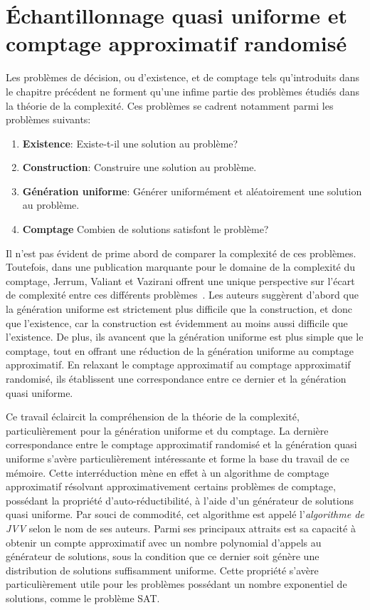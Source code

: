 \chapter{Échantillonnage quasi uniforme et comptage approximatif randomisé}
\label{cha:echantillonnage-quasi-uniforme-comptage-approximatif-randomise}

Les problèmes de décision, ou d'existence, et de comptage tels qu'introduits dans le chapitre précédent ne forment qu'une infime partie des problèmes étudiés dans la théorie de la complexité. Ces problèmes se cadrent notamment parmi les problèmes suivants:

\begin{enumerate}[(1)]
    \item \textbf{Existence}: Existe-t-il une solution au problème?
    \item \textbf{Construction}: Construire une solution au problème.
    \item \textbf{Génération uniforme}: Générer uniformément et aléatoirement une solution au problème.
    \item \textbf{Comptage} Combien de solutions satisfont le problème?
\end{enumerate}

Il n'est pas évident de prime abord de comparer la complexité de ces problèmes. Toutefois, dans une publication marquante pour le domaine de la complexité du comptage, Jerrum, Valiant et Vazirani offrent une unique perspective sur l'écart de complexité entre ces différents problèmes~\cite{jerrumRandomGenerationCombinatorial1986}. Les auteurs suggèrent d'abord que la génération uniforme est strictement plus difficile que la construction, et donc que l'existence, car la construction est évidemment au moins aussi difficile que l'existence. De plus, ils avancent que la génération uniforme est plus simple que le comptage, tout en offrant une réduction de la génération uniforme au comptage approximatif. En relaxant le comptage approximatif au comptage approximatif randomisé, ils établissent une correspondance entre ce dernier et la génération quasi uniforme.

Ce travail éclaircit la compréhension de la théorie de la complexité, particulièrement pour la génération uniforme et du comptage. La dernière correspondance entre le comptage approximatif randomisé et la génération quasi uniforme s'avère particulièrement intéressante et forme la base du travail de ce mémoire. Cette interréduction mène en effet à un algorithme de comptage approximatif résolvant approximativement certains problèmes de comptage, possédant la propriété d'auto-réductibilité, à l'aide d'un générateur de solutions quasi uniforme. Par souci de commodité, cet algorithme est appelé l'\textit{algorithme de JVV} selon le nom de ses auteurs. Parmi ses principaux attraits est sa capacité à obtenir un compte approximatif avec un nombre polynomial d'appels au générateur de solutions, sous la condition que ce dernier soit génère une distribution de solutions suffisamment uniforme. Cette propriété s'avère particulièrement utile pour les problèmes possédant un nombre exponentiel de solutions, comme le problème SAT.

